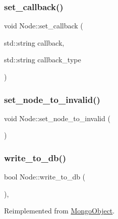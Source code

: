 \mbox{\label{class_node_afda492d07d8c3ed0e714d0249e015ffa}} 
\subsubsection{\texorpdfstring{set\+\_\+callback()}{set\_callback()}\hspace{0.1cm}{\footnotesize\ttfamily [2/2]}}
{\footnotesize\ttfamily void Node\+::set\+\_\+callback (\begin{DoxyParamCaption}\item[{std\+::string}]{callback,  }\item[{std\+::string}]{callback\+\_\+type }\end{DoxyParamCaption})}

\mbox{\label{class_node_ab9fe9ebcddc19a16dc518fd29e584da8}} 
\subsubsection{\texorpdfstring{set\+\_\+node\+\_\+to\+\_\+invalid()}{set\_node\_to\_invalid()}}
{\footnotesize\ttfamily void Node\+::set\+\_\+node\+\_\+to\+\_\+invalid (\begin{DoxyParamCaption}{ }\end{DoxyParamCaption})}

\mbox{\label{class_node_ad5cacb320e423275faef1bfc8c7a365b}} 
\subsubsection{\texorpdfstring{write\+\_\+to\+\_\+db()}{write\_to\_db()}}
{\footnotesize\ttfamily bool Node\+::write\+\_\+to\+\_\+db (\begin{DoxyParamCaption}{ }\end{DoxyParamCaption})\hspace{0.3cm}{\ttfamily [final]}, {\ttfamily [virtual]}}



Reimplemented from \hyperlink{class_mongo_object_a65971bad07dce8b649820f9dee5d0ae8}{Mongo\+Object}.




